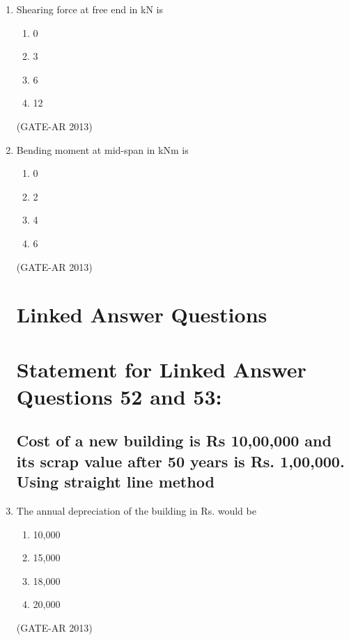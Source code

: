 \documentclass[a4paper,10pt]{article}
\begin{document}
\begin{enumerate}
    \item Shearing force at free end in kN is
    \begin{multicols}{4}
	\begin{enumerate}
        \item 0
        \item 3
        \item 6
        \item 12
    \end{enumerate}
	\end{multicols}
    \hfill (GATE-AR 2013)

    \item Bending moment at mid-span in kNm is
    \begin{multicols}{4}
	\begin{enumerate}
        \item 0
        \item 2
        \item 4
        \item 6
    \end{enumerate}
	\end{multicols}
    \hfill (GATE-AR 2013)

\section*{Linked Answer Questions}

\section*{Statement for Linked Answer Questions 52 and 53:}
\subsection*{Cost of a new building is Rs 10,00,000 and its scrap value after 50 years is Rs. 1,00,000. Using straight line method}

    \item The annual depreciation of the building in Rs. would be
    \begin{multicols}{4}
	\begin{enumerate}
        \item 10,000
        \item 15,000
        \item 18,000
        \item 20,000
    \end{enumerate}
	\end{multicols}
    \hfill (GATE-AR 2013)


\end{enumerate}
\end{document}

